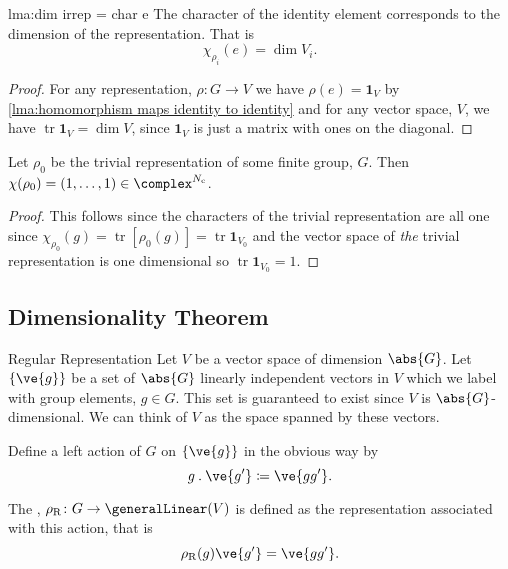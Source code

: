 \documentclass[fleqn]{NotesClass}
\newcommand*{\action}{\mathbin{.}}
\newcommand*{\ident}{\mathbf{1}}
\DeclareMathOperator{\tr}{tr}
\begin{document}
    
    \begin{lma}{}{lma:dim irrep = char e}
        The  character of the identity element corresponds to the dimension of the representation.
        That is
        \begin{equation}
            \chi_{\rho_i}(e) = \dim V_i.
        \end{equation}
        \begin{proof}
            For any representation, \(\rho \colon G \to V\) we have \(\rho(e) = \ident_{V}\) by \cref{lma:homomorphism maps identity to identity} and for any vector space, \(V\), we have \(\tr\ident_{V} = \dim V\), since \(\ident_V\) is just a matrix with ones on the diagonal.
        \end{proof}
    \end{lma}
    
    \begin{lma}{}{}
        Let \(\rho_0\) be the trivial representation of some finite group, \(G\).
        Then \(\chi(\rho_0) = (1, \dotsc, 1) \in \complex^{N_{\mathrm{c}}}\).
        \begin{proof}
            This follows since the characters of the trivial representation are all one since \(\chi_{\rho_0}(g) = \tr[\rho_0(g)] = \tr\ident_{V_0}\) and the vector space of \emph{the} trivial representation is one dimensional so \(\tr \ident_{V_0} = 1\).
        \end{proof}
    \end{lma}
    
    \subsection{Dimensionality Theorem}
    \begin{dfn}{Regular Representation}{}
        Let \(V\) be a vector space of dimension \(\abs{G}\).
        Let \(\{\ve{g}\}\) be a set of \(\abs{G}\) linearly independent vectors in \(V\) which we label with group elements, \(g \in G\).
        This set is guaranteed to exist since \(V\) is \(\abs{G}\)-dimensional.
        We can think of \(V\) as the space spanned by these vectors.
        
        Define a left action of \(G\) on \(\{\ve{g}\}\) in the obvious way by
        \begin{equation}
            g \action \ve{g'} \coloneqq \ve{gg'}.
        \end{equation}
        
        The , \(\rho_{\mathrm{R}} \colon G \to \generalLinear(V)\) is defined as the representation associated with this action, that is
        \begin{equation}
            \rho_{\mathrm{R}}(g) \ve{g'} = \ve{gg'}.
        \end{equation}
    \end{dfn}
    
\end{document}
